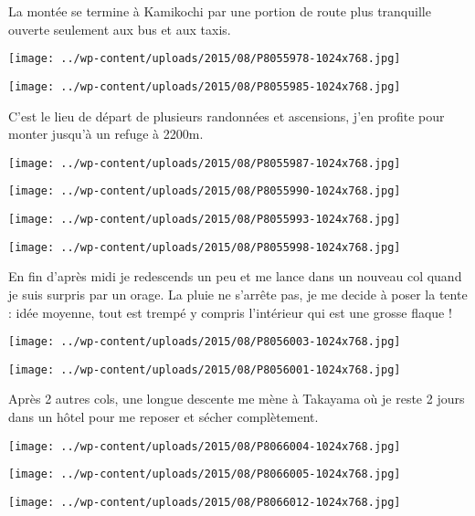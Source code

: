  La montée se termine à Kamikochi par une portion de route plus tranquille ouverte seulement aux bus et aux taxis. 
\begin{center} \texttt{[image: ../wp-content/uploads/2015/08/P8055978-1024x768.jpg]} \end{center}
\begin{center} \texttt{[image: ../wp-content/uploads/2015/08/P8055985-1024x768.jpg]} \end{center}

 C'est le lieu de départ de plusieurs randonnées et ascensions, j'en profite pour monter jusqu'à un refuge à 2200m. 
\begin{center} \texttt{[image: ../wp-content/uploads/2015/08/P8055987-1024x768.jpg]} \end{center}
\begin{center} \texttt{[image: ../wp-content/uploads/2015/08/P8055990-1024x768.jpg]} \end{center}
\begin{center} \texttt{[image: ../wp-content/uploads/2015/08/P8055993-1024x768.jpg]} \end{center}
\begin{center} \texttt{[image: ../wp-content/uploads/2015/08/P8055998-1024x768.jpg]} \end{center}

 En fin d'après midi je redescends un peu et me lance dans un nouveau col quand je suis surpris par un orage. La pluie ne s'arrête pas, je me decide à poser la tente : idée moyenne, tout est trempé y compris l'intérieur qui est une grosse flaque ! 
\begin{center} \texttt{[image: ../wp-content/uploads/2015/08/P8056003-1024x768.jpg]} \end{center}
\begin{center} \texttt{[image: ../wp-content/uploads/2015/08/P8056001-1024x768.jpg]} \end{center}

 Après 2 autres cols, une longue descente me mène à Takayama où je reste 2 jours dans un hôtel pour me reposer et sécher complètement. 
\begin{center} \texttt{[image: ../wp-content/uploads/2015/08/P8066004-1024x768.jpg]} \end{center}
\begin{center} \texttt{[image: ../wp-content/uploads/2015/08/P8066005-1024x768.jpg]} \end{center}
\begin{center} \texttt{[image: ../wp-content/uploads/2015/08/P8066012-1024x768.jpg]} \end{center}

